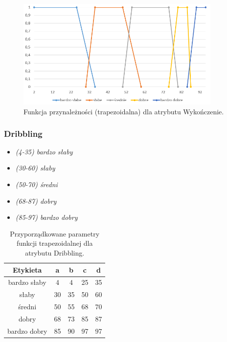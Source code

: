 \documentclass{classrep}
\begin{document}
	\begin{figure}[h!]
		\centering
		\includegraphics[width=0.9\textwidth]{zmienne/5.png}
		\caption{Funkcja przynależności (trapezoidalna) dla atrybutu Wykończenie.}
		\label{wykresWykonczenie}
	\end{figure}

	
	\newpage
	\subsubsection{Dribbling}
	\begin{itemize}
		\item \textsl{(4-35) bardzo słaby}
		\item \textsl{(30-60) słaby}
		\item \textsl{(50-70) średni}
		\item \textsl{(68-87) dobry}
		\item \textsl{(85-97) bardzo dobry}
	\end{itemize}
	
	\begin{table}[h!]
		\centering
		\begin{tabular} {c c c c c}
			\hline
			\textbf{Etykieta} & \textbf{a} & \textbf{b} & \textbf{c} & \textbf{d} \\ [0.5ex] 
			\hline	
			\hline 
			bardzo słaby & 4 & 4 & 25 &	35 \\
			słaby & 30 & 35 & 50 & 60  \\
			średni & 50 & 55 & 68 & 70  \\
			dobry & 68 & 73 & 85 & 87  \\
			bardzo dobry & 85 & 90 & 97 & 97  \\		
			\hline
		\end{tabular}
		\caption{Przyporządkowane parametry funkcji trapezoidalnej dla atrybutu Dribbling. }
		\label{tabelaDribbling}
	\end{table}
	
\end{document}
